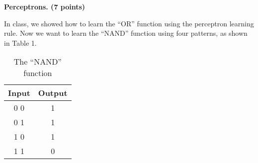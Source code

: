 \textbf{Perceptrons. (7 points)}

In class, we showed how to learn the ``OR'' function using the perceptron
learning rule. Now we want to learn the ``NAND'' function using four patterns, as shown in Table 1.

\begin{table}[ht]
	\begin{centering}
		\begin{tabular}{|c|c|}
			\hline
			Input & Output\tabularnewline
			\hline
			\hline
			0 0   & 1\tabularnewline
			\hline
			0 1   & 1\tabularnewline
			\hline
			1 0   & 1\tabularnewline
			\hline
			1 1   & 0\tabularnewline
			\hline
		\end{tabular}
		\par\end{centering}
	\caption{The ``NAND'' function}
\end{table}

